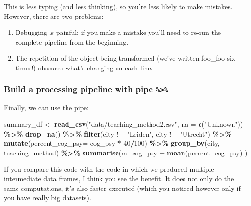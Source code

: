 \documentclass[
]{scrartcl}
\newenvironment{Shaded}{\begin{snugshade}}{\end{snugshade}}
\newcommand{\AttributeTok}[1]{\textcolor[rgb]{0.13,0.29,0.53}{#1}}
\newcommand{\DecValTok}[1]{\textcolor[rgb]{0.00,0.00,0.81}{#1}}
\newcommand{\FunctionTok}[1]{\textcolor[rgb]{0.13,0.29,0.53}{\textbf{#1}}}
\newcommand{\NormalTok}[1]{#1}
\newcommand{\OtherTok}[1]{\textcolor[rgb]{0.56,0.35,0.01}{#1}}
\newcommand{\SpecialCharTok}[1]{\textcolor[rgb]{0.81,0.36,0.00}{\textbf{#1}}}
\newcommand{\StringTok}[1]{\textcolor[rgb]{0.31,0.60,0.02}{#1}}
\providecommand{\tightlist}{%
  \setlength{\itemsep}{0pt}\setlength{\parskip}{0pt}}
\begin{document}
This is less typing (and less thinking), so you're less likely to make mistakes. However, there are two problems:

\begin{enumerate}
\def\labelenumi{\arabic{enumi}.}
\tightlist
\item
  Debugging is painful: if you make a mistake you'll need to re-run the complete pipeline from the beginning.
\item
  The repetition of the object being transformed (we've written foo\_foo six times!) obscures what's changing on each line.
\end{enumerate}

\hypertarget{build-a-processing-pipeline-with-pipe}{%
\subsubsection{\texorpdfstring{Build a processing pipeline with pipe \texttt{\%\textgreater{}\%}}{Build a processing pipeline with pipe \%\textgreater\%}}\label{build-a-processing-pipeline-with-pipe}}

Finally, we can use the pipe:

\begin{Shaded}
\begin{Highlighting}[]
\NormalTok{summary\_df }\OtherTok{\textless{}{-}} \FunctionTok{read\_csv}\NormalTok{(}\StringTok{"data/teaching\_method2.csv"}\NormalTok{, }\AttributeTok{na =} \FunctionTok{c}\NormalTok{(}\StringTok{"Unknown"}\NormalTok{)) }\SpecialCharTok{\%\textgreater{}\%}
        \FunctionTok{drop\_na}\NormalTok{() }\SpecialCharTok{\%\textgreater{}\%}
        \FunctionTok{filter}\NormalTok{(city }\SpecialCharTok{!=} \StringTok{"Leiden"}\NormalTok{, city }\SpecialCharTok{!=} \StringTok{"Utrecht"}\NormalTok{) }\SpecialCharTok{\%\textgreater{}\%}
        \FunctionTok{mutate}\NormalTok{(}\AttributeTok{percent\_cog\_psy=}\NormalTok{ cog\_psy }\SpecialCharTok{*} \DecValTok{40}\SpecialCharTok{/}\DecValTok{100}\NormalTok{) }\SpecialCharTok{\%\textgreater{}\%}
        \FunctionTok{group\_by}\NormalTok{(city, teaching\_method) }\SpecialCharTok{\%\textgreater{}\%}
        \FunctionTok{summarise}\NormalTok{(}\AttributeTok{m\_cog\_psy =} \FunctionTok{mean}\NormalTok{(percent\_cog\_psy) )}
\end{Highlighting}
\end{Shaded}

If you compare this code with the code in which we produced multiple \protect\hyperlink{intermediatesteps}{intermediate data frames}, I think you see the benefit. It does not only do the same computations, it's also faster executed (which you noticed however only if you have really big datasets).
\end{document}
